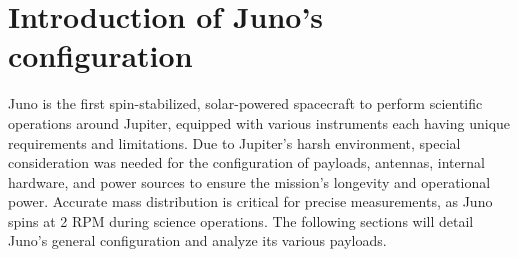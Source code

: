 \section{Introduction of Juno's configuration}
\label{sec:config_introduction}

Juno is the first spin-stabilized, solar-powered spacecraft to perform scientific operations around Jupiter, equipped with various instruments each having unique requirements and limitations. Due to Jupiter's harsh environment, special consideration was needed for the configuration of payloads, antennas, internal hardware, and power sources to ensure the mission's longevity and operational power. Accurate mass distribution is critical for precise measurements, as Juno spins at 2 RPM during science operations. The following sections will detail Juno's general configuration and analyze its various payloads.